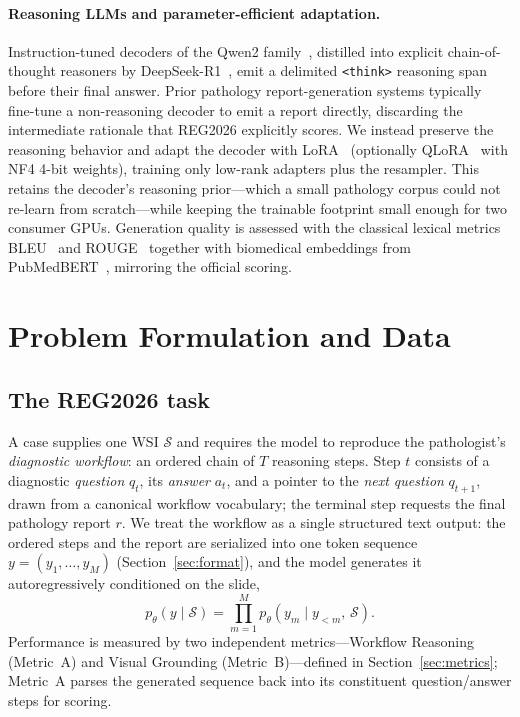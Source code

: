 \documentclass[11pt]{article}
\newcommand{\code}[1]{\texttt{\small #1}}
\begin{document}
\paragraph{Reasoning LLMs and parameter-efficient adaptation.} Instruction-tuned
decoders of the Qwen2 family~\cite{yang2024qwen2}, distilled into explicit
chain-of-thought reasoners by DeepSeek-R1~\cite{deepseek2025r1}, emit a delimited
\code{<think>} reasoning span before their final answer. Prior pathology
report-generation systems typically fine-tune a non-reasoning decoder to emit a
report directly, discarding the intermediate rationale that REG2026 explicitly
scores. We instead preserve the reasoning behavior and adapt the decoder with
LoRA~\cite{hu2022lora} (optionally QLoRA~\cite{dettmers2023qlora} with NF4 4-bit
weights), training only low-rank adapters plus the resampler. This retains the
decoder's reasoning prior---which a small pathology corpus could not re-learn from
scratch---while keeping the trainable footprint small enough for two consumer
GPUs. Generation quality is assessed with the classical lexical metrics
BLEU~\cite{papineni2002bleu} and ROUGE~\cite{lin2004rouge} together with
biomedical embeddings from PubMedBERT~\cite{gu2021pubmedbert}, mirroring the
official scoring.

\section{Problem Formulation and Data}
\label{sec:task}
\subsection{The REG2026 task}
A case supplies one WSI $\mathcal{S}$ and requires the model to reproduce the
pathologist's \emph{diagnostic workflow}: an ordered chain of $T$ reasoning
steps. Step $t$ consists of a diagnostic \emph{question} $q_t$, its \emph{answer}
$a_t$, and a pointer to the \emph{next question} $q_{t+1}$, drawn from a canonical
workflow vocabulary; the terminal step requests the final pathology report $r$.
We treat the workflow as a single structured text output: the ordered steps and
the report are serialized into one token sequence $y=(y_1,\dots,y_M)$
(Section~\ref{sec:format}), and the model generates it autoregressively
conditioned on the slide,
\begin{equation}
\label{eq:objective}
p_\theta\!\left(y \mid \mathcal{S}\right)=\prod_{m=1}^{M}
p_\theta\!\left(y_m \mid y_{<m},\,\mathcal{S}\right).
\end{equation}
Performance is measured by two independent metrics---Workflow Reasoning
(Metric~A) and Visual Grounding (Metric~B)---defined in
Section~\ref{sec:metrics}; Metric~A parses the generated sequence back into its
constituent question/answer steps for scoring.
\end{document}
